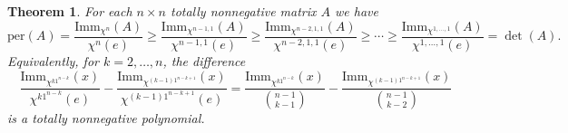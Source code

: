 \documentclass[12pt]{amsart}
\newtheorem{thm}{Theorem}[section]
\numberwithin{equation}{section}
\newcommand{\imm}[1]{\mathrm{Imm}_{#1}}
\newcommand{\perm}{\mathrm{per}}
\begin{document}
\begin{thm}\label{t:main}
  For each $n \times n$ totally nonnegative matrix $A$ we have
\begin{equation*}
   \perm(A)=\frac{\imm{\chi^n}(A)}{\chi^{n}(e)}\geq \frac{\imm{\chi^{n-1,1}}(A)}{\chi^{n-1,1}(e)}\geq \frac{\imm{\chi^{ n-2,1,1}}(A)}{\chi^{n-2,1,1}(e)}\geq \cdots \geq \frac{\imm{\chi^{1,\dotsc,1}}(A)}{\chi^{1,\dotsc,1}(e)}=\det(A).
\end{equation*} 
Equivalently, for $k = 2,\dotsc,n$,
the difference
        \begin{equation}\label{eq:thediff}
        \frac{\imm{\chi^{k1^{n-k}}}(x)}{\chi^{k1^{n-k}}(e)}
        -
        \frac{\imm{\chi^{(k-1)1^{n-k+1}}}(x)}{\chi^{(k-1)1^{n-k+1}}(e)}
        =
         \frac{\imm{\chi^{k1^{n-k}}}(x)}{\binom{n-1}{k-1}}
        -
        \frac{\imm{\chi^{(k-1)1^{n-k+1}}}(x)}{\binom{n-1}{k-2}}
    \end{equation}
        is a totally nonnegative polynomial.
\end{thm}
\end{document}
